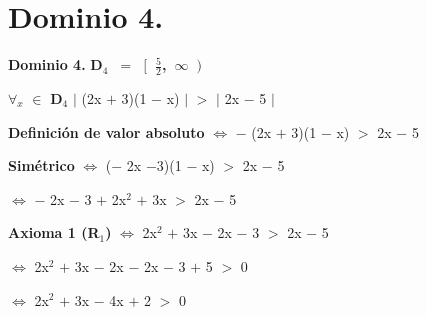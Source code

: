\documentclass[12pt]{article}
\newenvironment{MyColorPar}[1]{%
    \leavevmode\color{#1}\ignorespaces%
}{%
}%
\begin{document}
\section*{{\textcolor{Tarawera}{\textsf{Dominio 4.}}}}

\begin{MyColorPar}{Tarawera}
{\bfseries{Dominio 4.}}  {\bfseries{{\textcolor{Burnt Sienna}{\mbox{D$_{4}$ $=$ {$\Big[$}  {\Large{$\frac{5}{2}$}}, $\infty$ {$\Big )\ $}}}}}} 
\end{MyColorPar} \vspace{0.5cm}

\hspace{4.5cm} $\forall$$_{x}$ $\in$  {\bfseries{{\textcolor{Burnt Sienna}{\mbox{D$_{4}$}}}}} \hspace{0.5cm} $\mid$ (2x $+$ 3)(1 $-$ x) $\mid$ $>$ $\mid$ 2x $-$ 5 $\mid$ \vspace{0.5cm}

{\bfseries{Definición de valor absoluto}} \hspace{0.1cm} $\Longleftrightarrow$ \hspace{0.2cm} $-$ (2x $+$ 3)(1 $-$ x) $>$ 2x $-$ 5 \vspace{0.5cm}

\hspace{3cm} {\bfseries{Simétrico}} \hspace{.5cm} $\Longleftrightarrow$ \hspace{0.2cm} ($-$ 2x $-$3)(1 $-$ x) $>$  2x $-$ 5  \vspace{0.5cm}

\hspace{5.6cm} $\Longleftrightarrow$ \hspace{0.2cm} $-$ 2x $-$ 3 $+$ 2x$^{2}$ $+$ 3x $>$ 2x $-$ 5 \vspace{0.5cm}

\hspace{2cm} {\bfseries{{\textcolor{carrotorange}{Axioma 1 (R$_{1}$)}}}} \hspace{.5cm} $\Longleftrightarrow$ \hspace{0.2cm} 2x$^{2}$ $+$ 3x $-$ 2x $-$ 3  $>$  2x $-$ 5 \vspace{0.5cm}

\hspace{5.6cm} $\Longleftrightarrow$ \hspace{0.2cm} 2x$^{2}$ $+$ 3x $-$ 2x $-$ 2x $-$ 3 $+$ 5 $>$ $0$ \vspace{0.5cm}


\hspace{5.6cm} $\Longleftrightarrow$ \hspace{0.2cm} 2x$^{2}$ $+$ 3x $-$ 4x $+$ 2 $>$ $0$ \vspace{0.5cm}
\end{document}
